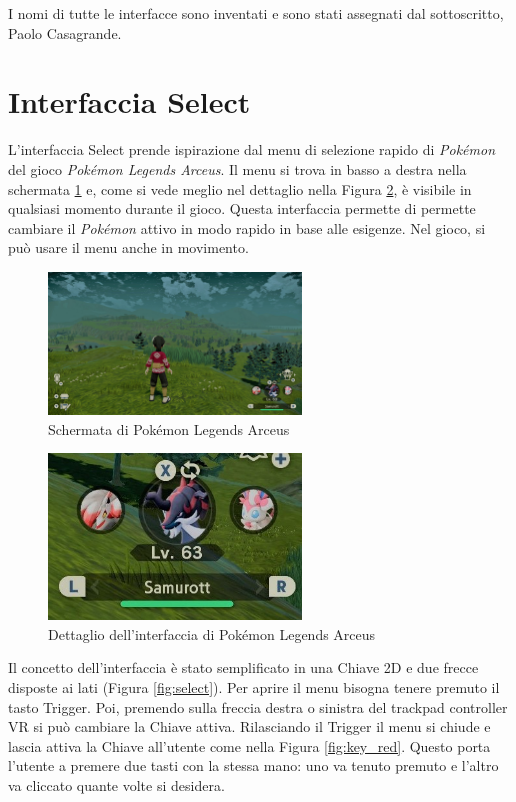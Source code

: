 \documentclass[target=bach,aauheader=]{thud}
\begin{document}
I nomi di tutte le interfacce sono inventati e sono stati assegnati dal sottoscritto, Paolo Casagrande.

\section{Interfaccia Select} %
\label{select}
L'interfaccia Select prende ispirazione dal menu di selezione rapido di \textit{Pokémon} del gioco \textit{Pokémon Legends Arceus}. 
Il menu si trova in basso a destra nella schermata \ref{fig:pok1} e, come si vede meglio nel dettaglio nella Figura \ref{fig:pok2}, è visibile in qualsiasi momento durante il gioco.
Questa interfaccia permette di permette cambiare il \textit{Pokémon} attivo in modo rapido in base alle esigenze. 
Nel gioco, si può usare il menu anche in movimento.

\begin{figure}[h]
    \centering
    \includegraphics[width=0.60\textwidth]{pok1}
    \caption{Schermata di Pokémon Legends Arceus}
    \label{fig:pok1}
\end{figure}

\begin{figure}[h]
    \centering
    \includegraphics[width=0.60\textwidth]{pok2}
    \caption{Dettaglio dell'interfaccia di Pokémon Legends Arceus}
    \label{fig:pok2}
\end{figure}

Il concetto dell'interfaccia è stato semplificato in una Chiave 2D e due frecce disposte ai lati (Figura \ref{fig:select}).
Per aprire il menu bisogna tenere premuto il tasto Trigger.
Poi, premendo sulla freccia destra o sinistra del trackpad controller VR si può cambiare la Chiave attiva.
Rilasciando il Trigger il menu si chiude e lascia attiva la Chiave all'utente come nella Figura \ref{fig:key_red}.
Questo porta l'utente a premere due tasti con la stessa mano: uno va tenuto premuto e l'altro va cliccato quante volte si desidera. \\
\end{document}
